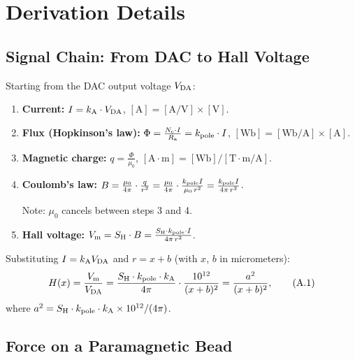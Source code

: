 \appendix

\section{Derivation Details}
\label{app:derivations}

\subsection{Signal Chain: From DAC to Hall Voltage}

Starting from the DAC output voltage $V_\mathrm{DA}$:

\begin{enumerate}
\item \textbf{Current:}
$I = k_\mathrm{A} \cdot V_\mathrm{DA}$, \quad $[\si{\ampere}] = [\si{\ampere/\volt}] \times [\si{\volt}]$.

\item \textbf{Flux (Hopkinson's law):}
$\Phi = \frac{N_\mathrm{c} \cdot I}{R_\mathrm{a}} = k_\mathrm{pole} \cdot I$, \quad
$[\si{\weber}] = [\si{\weber/\ampere}] \times [\si{\ampere}]$.

\item \textbf{Magnetic charge:}
$q = \frac{\Phi}{\mu_0}$, \quad
$[\si{\ampere\cdot\metre}] = [\si{\weber}] / [\si{\tesla\cdot\metre/\ampere}]$.

\item \textbf{Coulomb's law:}
$B = \frac{\mu_0}{4\pi} \cdot \frac{q}{r^2}
   = \frac{\mu_0}{4\pi} \cdot \frac{k_\mathrm{pole} I}{\mu_0 \, r^2}
   = \frac{k_\mathrm{pole} I}{4\pi \, r^2}$.

Note: $\mu_0$ cancels between steps 3 and 4.

\item \textbf{Hall voltage:}
$V_\mathrm{m} = S_\mathrm{H} \cdot B = \frac{S_\mathrm{H} \cdot k_\mathrm{pole} \cdot I}{4\pi \, r^2}$.
\end{enumerate}

Substituting $I = k_\mathrm{A} V_\mathrm{DA}$ and $r = x + b$ (with $x$, $b$ in micrometers):
\begin{equation}
H(x) = \frac{V_\mathrm{m}}{V_\mathrm{DA}} = \frac{S_\mathrm{H} \cdot k_\mathrm{pole} \cdot k_\mathrm{A}}{4\pi} \cdot
\frac{10^{12}}{(x + b)^2} = \frac{a^2}{(x+b)^2},
\tag{A.1}
\end{equation}
where $a^2 = S_\mathrm{H} \cdot k_\mathrm{pole} \cdot k_\mathrm{A} \times 10^{12} / (4\pi)$.

\subsection{Force on a Paramagnetic Bead}


